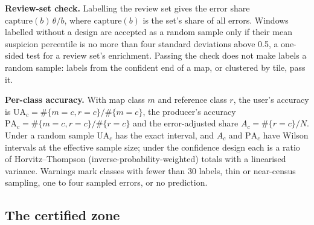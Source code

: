 \documentclass[11pt,a4paper]{article}
\begin{document}
\textbf{Review-set check.} Labelling the review set gives the error share $\mathrm{capture}(b)\,\theta/b$, where
$\mathrm{capture}(b)$ is the set's share of all errors. Windows labelled without a design are accepted as a random
sample only if their mean suspicion percentile is no more than four standard deviations above 0.5, a one-sided test
for a review set's enrichment. Passing the check does not
make labels a random sample: labels from the confident end of a map, or clustered by tile, pass it.

\textbf{Per-class accuracy.} With map class $m$ and reference class $r$, the user's accuracy is
$\mathrm{UA}_c = \#\{m{=}c, r{=}c\}/\#\{m{=}c\}$, the producer's accuracy $\mathrm{PA}_c = \#\{m{=}c, r{=}c\}/\#\{r{=}c\}$
and the error-adjusted share $A_c = \#\{r{=}c\}/N$. Under a random sample $\mathrm{UA}_c$ has the exact interval, and
$A_c$ and $\mathrm{PA}_c$ \citep{olofsson2014} have Wilson intervals at the effective sample size; under the confidence
design each is a ratio of Horvitz--Thompson (inverse-probability-weighted) totals with a linearised variance. Warnings
mark classes with fewer than 30 labels, thin or near-census sampling, one to four sampled errors, or no prediction.

\subsection{The certified zone}
\label{sec:zone}
\end{document}
